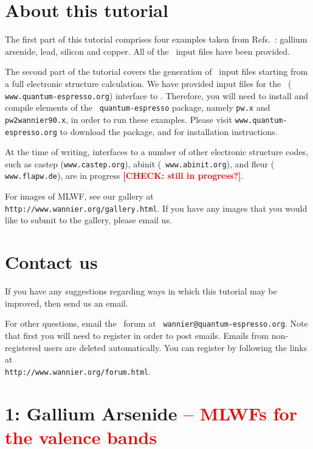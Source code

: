 \documentclass[a4paper,11pt,twoside]{article}
\def\tent#1{\textcolor{red}{#1}}     %
\begin{document}
\section*{About this tutorial}

The first part of this tutorial comprises four examples taken from
Refs.~\cite{MV,SMV}: gallium arsenide, lead, silicon and copper. All
of the \wannier\ input files have been provided.

The second part of the tutorial covers the generation of \wannier\
input files starting from a full electronic structure calculation. We
have provided input files for the \pwscf\ ({\tt
  www.quantum-espresso.org}) interface to \wannier. Therefore, you
will need to install and compile elements of the {\tt
  quantum-espresso} package, namely {\tt pw.x} and {\tt
  pw2wannier90.x}, in order to run these
examples. Please visit {\tt www.quantum-espresso.org} to download the
package, and for installation instructions. 

At the time of
writing, interfaces to a number of other electronic structure codes,
such as {\sc 
  castep} ({\tt www.castep.org}), {\sc abinit} ({\tt
  www.abinit.org}), and {\sc fleur} ({\tt
  www.flapw.de}), are in progress \tent{{\bf [CHECK: still in progress?]}}.

For images of MLWF, see our gallery at {\tt
  http://www.wannier.org/gallery.html}. If you have any images that
  you would like to submit to the gallery, please email us.

\section*{Contact us}

If you have any suggestions regarding ways in which this tutorial may
be improved, then send us an email.

For other questions, email the \wannier\ forum at {\tt
  wannier@quantum-espresso.org}.  Note that first you will need to
register in order to post emails. Emails from non-registered users are
deleted automatically. You can register by following the links at\\
{\tt http://www.wannier.org/forum.html}.



\cleardoublepage

\section*{1: Gallium Arsenide \tent{-- MLWFs for the valence bands}}
\end{document}
